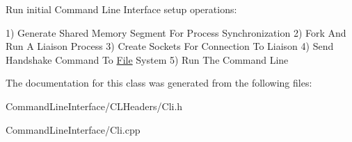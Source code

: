 Run initial Command Line Interface setup operations\+:

1) Generate Shared Memory Segment For Process Synchronization 2) Fork And Run A Liaison Process 3) Create Sockets For Connection To Liaison 4) Send Handshake Command To \mbox{\hyperlink{classFile}{File}} System 5) Run The Command Line 

The documentation for this class was generated from the following files\+:\begin{DoxyCompactItemize}
\item 
Command\+Line\+Interface/\+C\+L\+Headers/Cli.\+h\item 
Command\+Line\+Interface/Cli.\+cpp\end{DoxyCompactItemize}
